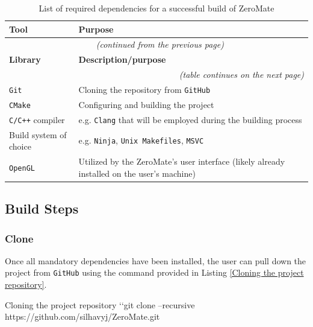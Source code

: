 \documentclass[english, ing, kiv, he, iso690numb, pdf]{fasthesis}
\begin{document}
	\begin{center}
		\begin{longtable}{p{}p{}}
			\caption{List of required dependencies for a successful build of ZeroMate}
			\label{List of required dependencies for a successful build of ZeroMate}\\
			\toprule[1.5pt]
			\textbf{Tool} & \textbf{Purpose}\\
			\midrule
			\endfirsthead
			\multicolumn{2}{c}{\tablename{}~\thetable{} \textit{(continued from the previous page)}}\\
			\midrule
			\textbf{Library} & \textbf{Description/purpose}\\
			\midrule
			\endhead
			\midrule
			\multicolumn{2}{r}{\textit{(table continues on the next page)}}\\
			\endfoot
			\bottomrule[1.5pt]
			\endlastfoot
			\texttt{Git} & Cloning the repository from \texttt{GitHub}\\
			\texttt{CMake} & Configuring and building the project\\
			\texttt{C/C++} compiler & e.g. \texttt{Clang} that will be employed during the building process\\
			Build system of choice & e.g. \texttt{Ninja}, \texttt{Unix Makefiles}, \texttt{MSVC}\\
			\texttt{OpenGL} & Utilized by the ZeroMate's user interface (likely already installed on the user's machine)
		\end{longtable}
	\end{center}
	
	\newpage
	
	\subsection{Build Steps}
	
	\subsubsection{Clone}
	
	Once all mandatory dependencies have been installed, the user can pull down the project from \texttt{GitHub} using the command provided in Listing \ref{Cloning the project repository}.
	
\begin{console}{Cloning the project repository\label{Cloning the project repository}}
`\uxprompt`git clone --recursive
https://github.com/silhavyj/ZeroMate.git
\end{console}
	
\end{document}
